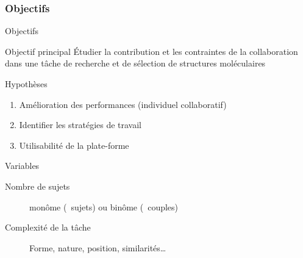 \documentclass[english,french,dvips,10pt]{mybeamer}
\begin{document}
	\subsubsection{Objectifs}
	\begin{myframe}{Objectifs}
		\begin{myblock}{Objectif principal}
			Étudier la contribution et les contraintes de la collaboration dans une tâche de recherche et de sélection de structures moléculaires
		\end{myblock}
		\begin{myplusblock}{Hypothèses}
			\begin{enumerate}
				\item Amélioration des performances (individuel \myvs collaboratif)
				\item Identifier les stratégies de travail
				\item Utilisabilité de la plate-forme
			\end{enumerate}
		\end{myplusblock}
		\begin{myblock}{Variables}
			\begin{description}
				\item[Nombre de sujets] monôme (~sujets) ou binôme (~couples)
				\item[Complexité de la tâche] Forme, nature, position, similarités\dots{}
			\end{description}
		\end{myblock}
	\end{myframe}
\end{document}
